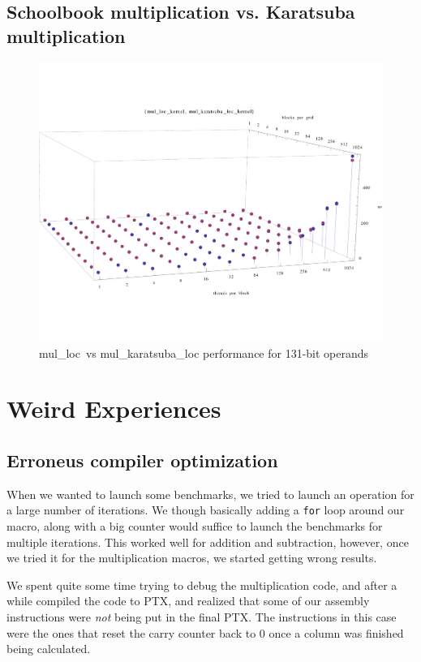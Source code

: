 \documentclass[12pt, a4paper]{report}
\begin{document}
\subsection*{Schoolbook multiplication vs. Karatsuba multiplication}
\begin{figure}[h]
\centering
\includegraphics[scale=0.3]{figs/mul_loc_vs_karatsuba_loc_kepler_131_duration}
\caption{mul\_loc\ vs mul\_karatsuba\_loc performance for 131-bit operands}
\label{fig:shift_addition_karatsuba_final}
\end{figure}

\section{Weird Experiences}
\subsection{Erroneus compiler optimization}
When we wanted to launch some benchmarks, we tried to launch an operation for a
large number of iterations.
We though basically adding a \verb+for+ loop around our macro, along with a big
counter would suffice to launch the benchmarks for multiple iterations.
This worked well for addition and subtraction, however, once we tried it for
the multiplication macros, we started getting wrong results.

We spent quite some time trying to debug the multiplication code, and after a while
compiled the code to PTX, and realized that some of our assembly instructions were
\emph{not} being put in the final PTX.
The instructions in this case were the ones that reset the carry counter back to 0
once a column was finished being calculated.
\end{document}
